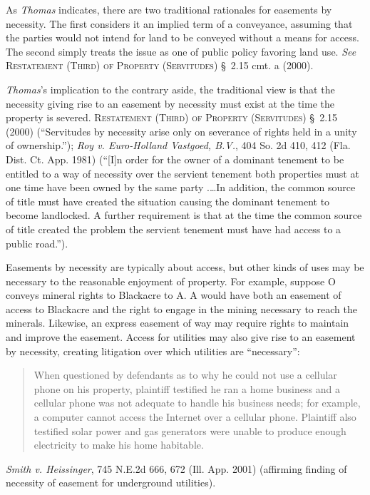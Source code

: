 
\item As \textit{Thomas} indicates, there are two traditional rationales for
easements by necessity. The first considers it an implied term of a conveyance,
assuming that the parties would not intend for land to be conveyed without a
means for access. The second simply treats the issue as one of public policy
favoring land use. \textit{See} \textsc{Restatement (Third) of Property
(Servitudes)} \S~2.15 cmt. a (2000).


\item \textit{Thomas}'s implication to the contrary aside, the traditional
view is that the necessity giving rise to an easement by necessity must exist at
the time the property is severed. \textsc{Restatement (Third) of Property
(Servitudes)}
\S~2.15 (2000) (``Servitudes by necessity arise only on severance of rights held
in a unity of ownership.''); \emph{Roy v. Euro-Holland Vastgoed, B.V.}, 404 So.
2d 410, 412 (Fla. Dist. Ct. App. 1981) (``[I]n order for the owner of a dominant
tenement to be entitled to a way of necessity over the servient tenement both
properties must at one time have been owned by the same party .\ldots In
addition, the common source of title must have created the situation causing the
dominant tenement to become landlocked. A further requirement is that at the
time the common source of title created the problem the servient tenement must
have had access to a public road.'').


\item Easements by necessity are typically about access, but other kinds of uses
may be necessary to the reasonable enjoyment of property. For example, suppose O
conveys mineral rights to Blackacre to A. A would have both an easement of
access to Blackacre and the right to engage in the mining necessary to reach the
minerals. Likewise, an express easement of way may require rights to maintain
and improve the easement. Access for utilities may also give rise to an easement
by necessity, creating litigation over which utilities are ``necessary'':
\begin{quote}
When questioned by defendants as to why he could not use a cellular phone on his
property, plaintiff testified he ran a home business and a cellular phone was
not adequate to handle his business needs; for example, a computer cannot access
the Internet over a cellular phone. Plaintiff also testified solar power and gas
generators were unable to produce enough electricity to make his home
habitable.
\end{quote}
\emph{Smith v. Heissinger}, 745 N.E.2d 666, 672 (Ill. App. 2001) (affirming
finding of necessity of easement for underground utilities). 


